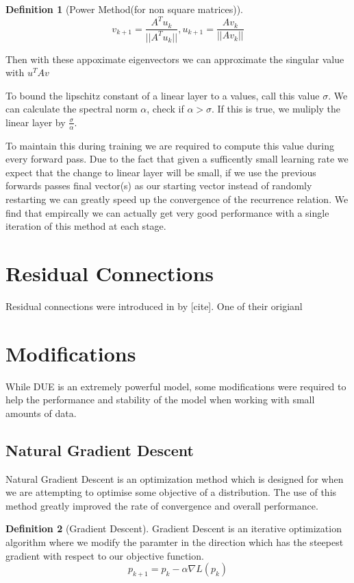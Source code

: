 \documentclass[12pt, a4paper]{report}
\theoremstyle{definition}
\newtheorem{definition}{Definition}[section]
\begin{document}
\begin{definition}[Power Method(for non square matrices)]
    $$v_{k+1} = \frac{A^Tu_k}{||A^Tu_k||}, u_{k+1} = \frac{Av_k}{||Av_k||} $$
\end{definition}

Then with these appoximate eigenvectors we can approximate the singular value with $u^T A v$

To bound the lipschitz constant of a linear layer to a values, call this value $\sigma$. We can calculate the spectral norm $\alpha$, check if $\alpha > \sigma$. If this is true, we muliply the linear layer by $\frac{\sigma}{\alpha}$.

To maintain this during training we are required to compute this value during every forward pass. Due to the fact that given a sufficently small learning rate we expect that the change to linear layer will be small, if we use the previous forwards passes final vector(s) as our starting vector instead of randomly restarting we can greatly speed up the convergence of the recurrence relation. We find that empircally we can actually get very good performance with a single iteration of this method at each stage.


\section{Residual Connections}

Residual connections were introduced in by [cite]. One of their origianl 


\section{Modifications}

While DUE is an extremely powerful model, some modifications were required to help the performance and stability of the model when working with small amounts of data. 

\subsection{Natural Gradient Descent}

Natural Gradient Descent is an optimization method which is designed for when we are attempting to optimise some objective of a distribution. The use of this method greatly improved the rate of convergence and overall performance.


\begin{definition}[Gradient Descent]
    Gradient Descent is an iterative optimization algorithm where we modify the paramter in the direction which has the steepest gradient with respect to our objective function.
    $$p_{k+1} = p_{k} -  \alpha \nabla L(p_k)$$
\end{definition}
\end{document}
